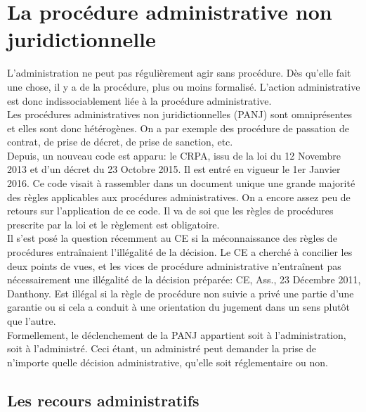 \documentclass[10pt, a4paper, openany]{book}
\begin{document}
\part{La procédure administrative non juridictionnelle}

L'administration ne peut pas régulièrement agir sans procédure. Dès qu'elle fait une chose, il y a de la procédure, plus ou moins formalisé. L'action administrative est donc indissociablement liée à la procédure administrative. \\
Les procédures administratives non juridictionnelles (PANJ) sont omniprésentes et elles sont donc hétérogènes. On a par exemple des procédure de passation de contrat, de prise de décret, de prise de sanction, etc. \\
Depuis, un nouveau code est apparu: le CRPA, issu de la loi du 12 Novembre 2013 et d'un décret du 23 Octobre 2015. Il est entré en vigueur le 1er Janvier 2016. Ce code visait à rassembler dans un document unique une grande majorité des règles applicables aux procédures administratives. On a encore assez peu de retours sur l'application de ce code. Il va de soi que les règles de procédures prescrite par la loi et le règlement est obligatoire. \\
Il s'est posé la question récemment au CE si la méconnaissance des règles de procédures entraînaient l'illégalité de la décision. Le CE a cherché à concilier les deux points de vues, et les vices de procédure administrative n'entraînent pas nécessairement une illégalité de la décision préparée: CE, Ass., 23 Décembre 2011, Danthony. Est illégal si la règle de procédure non suivie a privé une partie d'une garantie ou si cela a conduit à une orientation du jugement dans un sens plutôt que l'autre. \\
Formellement, le déclenchement de la PANJ appartient soit à l'administration, soit à l'administré. Ceci étant, un administré peut demander la prise de n'importe quelle décision administrative, qu'elle soit réglementaire ou non. 

\chapter{Les recours administratifs}
\end{document}
